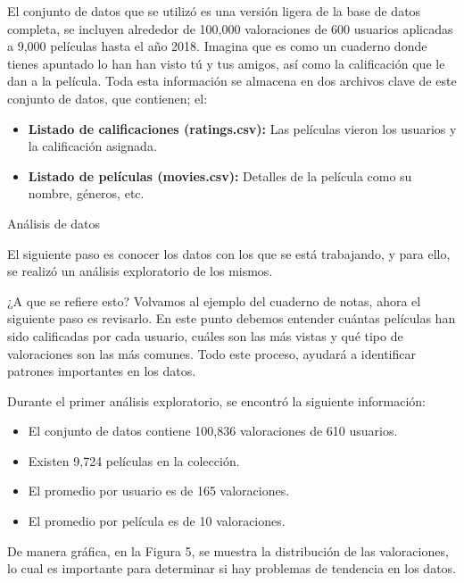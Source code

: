 \documentclass[letterpaper,10pt,final,hyphenatedtitles]{papertexKS}
\begin{document}
\begin{news}{2}
	\begin{center}
	\end{center}

	El conjunto de datos que se utilizó es una versión ligera de la base de datos completa, se incluyen alrededor de 100,000 valoraciones de 600 usuarios aplicadas a 9,000 películas hasta el año 2018. Imagina que es como un cuaderno donde tienes apuntado lo han han visto tú y tus amigos, así como la calificación que le dan a la película. Toda esta información se almacena en dos archivos clave de este conjunto de datos, que contienen; el:

	\begin{itemize}
		\item \textbf{Listado de calificaciones (ratings.csv):} Las películas vieron los usuarios y la calificación asignada.
		\item \textbf{Listado de películas (movies.csv):} Detalles de la película como su nombre, géneros, etc.
	\end{itemize}
    
	\noindent\textcolor{color}{\Large{Análisis de datos}}

	El siguiente paso es conocer los datos con los que se está trabajando, y para ello, se realizó un análisis exploratorio de los mismos.

	¿A que se refiere esto? Volvamos al ejemplo del cuaderno de notas, ahora el siguiente paso es revisarlo. En este punto debemos entender cuántas películas han sido calificadas por cada usuario, cuáles son las más vistas y qué tipo de valoraciones son las más comunes. Todo  este proceso, ayudará a identificar patrones importantes en los datos.

	Durante el primer análisis exploratorio, se encontró la siguiente información:

	\begin{itemize}
		\item El conjunto de datos contiene 100,836 valoraciones de 610 usuarios. 
		\item Existen 9,724 películas en la colección.
		\item El promedio por usuario es de 165 valoraciones.
		\item El promedio por película es de 10 valoraciones.
	\end{itemize}

	De manera gráfica, en la Figura 5, se muestra la distribución de las valoraciones, lo cual es importante para determinar si hay problemas de tendencia en los datos.


\end{news}
\end{document}
